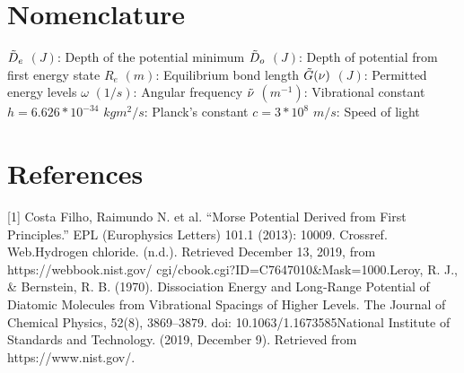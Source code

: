 \documentclass[letterpaper,12pt]{article}
\begin{document}
\section{Nomenclature}
$\Tilde{D}_e$ $(J)$: Depth of the potential minimum\newline
$\Tilde{D}_o$ $(J)$: Depth of potential from first energy state\newline
$R_e$ $(m)$: Equilibrium bond length\newline
$\Tilde{G}(\nu)$ $(J)$: Permitted energy levels \newline
$\omega$ $(1/s)$: Angular frequency\newline
$\Tilde{\nu}$ $(m^{-1})$: Vibrational constant\newline
$h=6.626*10^{-34}$ $kgm^2/s$: Planck's constant\newline
$c=3*10^8$ $m/s$: Speed of light\newline
\section{References}
[1] Costa Filho, Raimundo N. et al. “Morse Potential Derived from First Principles.” EPL (Europhysics Letters) 101.1 (2013): 10009. Crossref. Web.\newline
[2] Hydrogen chloride. (n.d.). Retrieved December 13, 2019, from https://webbook.nist.gov/\newline
cgi/cbook.cgi?ID=C7647010&Mask=1000.\newline
[3] Leroy, R. J., & Bernstein, R. B. (1970). Dissociation Energy and Long‐Range Potential of Diatomic Molecules from Vibrational Spacings of Higher Levels. The Journal of Chemical Physics, 52(8), 3869–3879. doi: 10.1063/1.1673585\newline
[4] National Institute of Standards and Technology. (2019, December 9). Retrieved from https://www.nist.gov/.
\end{document}
